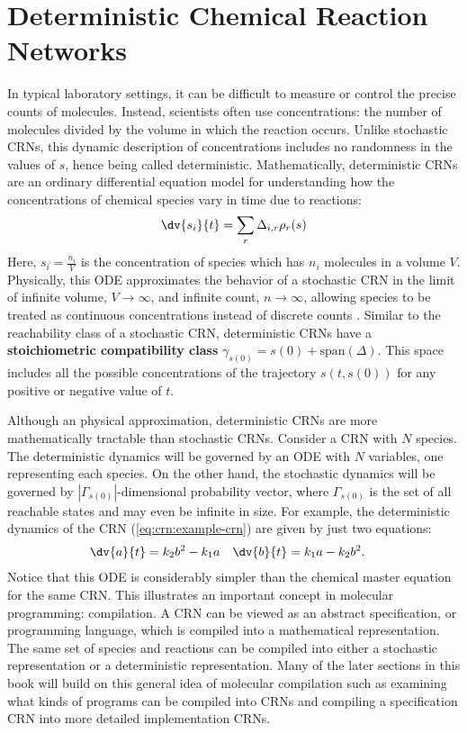 \section{Deterministic Chemical Reaction Networks}
%
In typical laboratory settings, it can be difficult to measure or control the precise counts of molecules.
Instead, scientists often use concentrations: the number of molecules divided by the volume in which the reaction occurs. Unlike stochastic CRNs, this dynamic description of concentrations includes no randomness in the values of $s$, hence being called deterministic. Mathematically, deterministic CRNs are an ordinary differential equation model for understanding how the concentrations of chemical species vary in time due to reactions:
%
\begin{equation*}
    \dv{s_i}{t} = \sum_r \Delta_{i, r} \rho_r(s)
\end{equation*}
%
Here, $s_i = \frac{n_i}{V}$ is the concentration of species  which has $n_i$ molecules in a volume $V$. Physically, this ODE approximates the behavior of a stochastic CRN in the limit of infinite volume, $V \to \infty$, and infinite count, $n \to \infty$, allowing species to be treated as continuous concentrations instead of discrete counts \cite{}. Similar to the reachability class of a stochastic CRN, deterministic CRNs have a \textbf{stoichiometric compatibility class} $\gamma_{s(0)} = s(0) + \textrm{span}(\Delta)$. This space includes all the possible concentrations of the trajectory $s(t, s(0))$ for any positive or negative value of $t$.

Although an physical approximation, deterministic CRNs are more mathematically tractable than stochastic CRNs. Consider a CRN with $N$ species. The deterministic dynamics will be governed by an ODE with $N$ variables, one representing each species. On the other hand, the stochastic dynamics will be governed by $|\Gamma_{s(0)}|$-dimensional probability vector, where $\Gamma_{s(0)}$ is the set of all reachable states and may even be infinite in size. For example, the deterministic dynamics of the CRN (\ref{eq:crn:example-crn}) are given by just two equations:
%
\begin{align*}
    \dv{a}{t} &= k_2 b^2 - k_1 a &
    \dv{b}{t} &= k_1 a - k_2 b^2.
\end{align*}
%
Notice that this ODE is considerably simpler than the chemical master equation for the same CRN. This illustrates an important concept in molecular programming: compilation. A CRN can be viewed as an abstract specification, or programming language, which is compiled into a mathematical representation. The same set of species and reactions can be compiled into either a stochastic representation or a deterministic representation. Many of the later sections in this book will build on this general idea of molecular compilation such as examining what kinds of programs can be compiled into CRNs and compiling a specification CRN into more detailed implementation CRNs.

